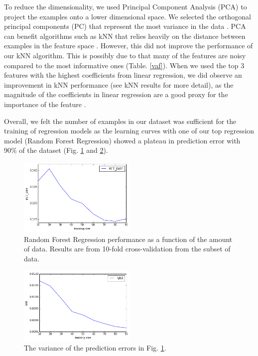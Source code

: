 \documentclass[conference]{IEEEtran}
\begin{document}
To reduce the dimensionality, we used Principal Component Analysis (PCA) to project the examples onto a lower dimensional space. We selected the orthogonal principal components (PC) that represent the most variance in the data \cite{bishop2006pattern}. PCA can benefit algorithms such as kNN that relies heavily on the distance between examples in the feature space \cite{bishop2006pattern}. However, this did not improve the performance of our kNN algorithm. This is possibly due to that many of the features are noisy compared to the most informative ones (Table. \ref{vaf}). When we used the top 3 features with the highest coefficients from linear regression, we did observe an improvement in kNN performance (see kNN results for more detail), as the magnitude of the coefficients in linear regression are a good proxy for the importance of the feature \cite{Guyon2002}.

Overall, we felt the number of examples in our dataset was sufficient for the training of regression models as the learning curves with one of our top regression model (Random Forest Regression) showed a plateau in prediction error with 90\% of the dataset (Fig. \ref{lr1} and \ref{lr2}).

\begin{figure}[H]
\centering
\includegraphics[width=0.5\textwidth]{perDiff.png}
\caption{\scriptsize Random Forest Regression performance as a function of the amount of data. Results are from 10-fold cross-validation from the subset of data.}
\label{lr1}
\end{figure}

\begin{figure}[H]
\centering
\includegraphics[width=0.5\textwidth]{var.png}
\caption{\scriptsize The variance of the prediction errors in Fig. \ref{lr1}.}
\label{lr2}
\end{figure}
\end{document}
